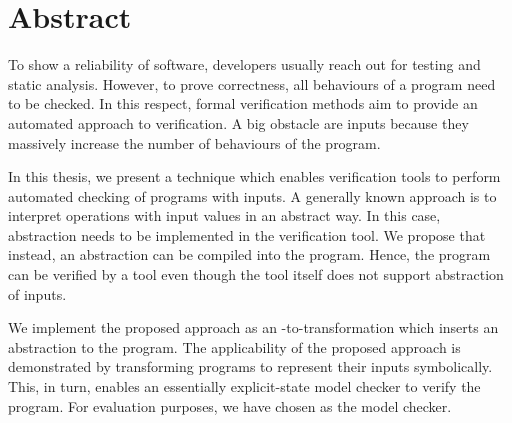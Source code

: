 \chapter*{Abstract}

To show a reliability of software, developers usually reach out for testing
and static analysis. However, to prove correctness, all behaviours of a
program need to be checked. In this respect, formal verification methods aim to
provide an automated approach to verification. A big obstacle are inputs because they massively increase the number of behaviours of the program.

In this thesis, we present a technique which enables verification tools to
perform automated checking of programs with inputs. A generally known approach
is to interpret operations with input values in an abstract way. In this case,
abstraction needs to be implemented in the verification tool. We propose that
instead, an abstraction can be compiled into the program. Hence, the program
can be verified by a tool even though the tool itself does not support
abstraction of inputs.

We implement the proposed approach as an \LLVM-to-\LLVM transformation which
inserts an abstraction to the program. The applicability of the proposed
approach is demonstrated by transforming programs to represent their inputs
symbolically. This, in turn, enables an essentially explicit-state model checker
to verify the program. For evaluation purposes, we have chosen \DIVINE as the model checker.
